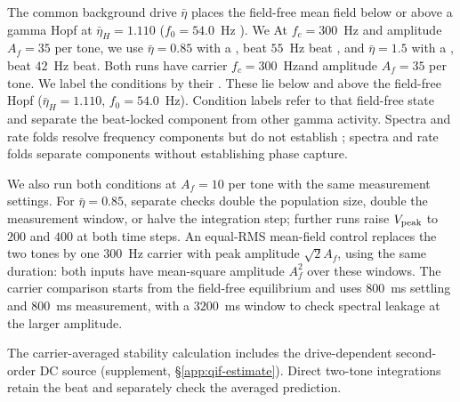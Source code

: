 \documentclass[11pt,a4paper]{article}
\providecommand{\DIFaddtex}[1]{{\protect\color{blue} \sf #1}} %
\providecommand{\DIFdeltex}[1]{{\protect\color{red} \scriptsize #1}} %
\providecommand{\DIFaddbegin}{} %
\providecommand{\DIFaddend}{} %
\providecommand{\DIFdelbegin}{} %
\providecommand{\DIFdelend}{} %
\providecommand{\DIFadd}[1]{\texorpdfstring{\DIFaddtex{#1}}{#1}} %
\providecommand{\DIFdel}[1]{\texorpdfstring{\DIFdeltex{#1}}{}} %
\begin{document}
\DIFdelbegin \DIFdel{The common background drive $\bar\eta$ places the field-free mean field below or
above a gamma Hopf at $\bar\eta_H=1.110$ ($f_0=54.0$~Hz ). We }\DIFdelend \DIFaddbegin \DIFadd{At $f_c=300$~Hz and amplitude $A_f=35$ per tone, we }\DIFaddend use
$\bar\eta=0.85$\DIFdelbegin \DIFdel{with a }\DIFdelend \DIFaddbegin \DIFadd{, beat }\DIFaddend $55$~Hz\DIFdelbegin \DIFdel{beat }\DIFdelend \DIFaddbegin \DIFadd{, }\DIFaddend and $\bar\eta=1.5$\DIFdelbegin \DIFdel{with a }\DIFdelend \DIFaddbegin \DIFadd{, beat }\DIFaddend $42$~Hz\DIFdelbegin \DIFdel{beat.
Both runs have carrier $f_c=300$~Hzand amplitude $A_f=35$ per tone. We label the conditions by their }\DIFdelend \DIFaddbegin \DIFadd{.
These lie below and above the }\DIFaddend field-free \DIFaddbegin \DIFadd{Hopf
($\bar\eta_H=1.110$, $f_0=54.0$~Hz). Condition labels refer to that
field-free }\DIFaddend state\DIFdelbegin \DIFdel{and separate the beat-locked
component from other gamma activity. Spectra and rate folds resolve frequency components but do not establish
}\DIFdelend \DIFaddbegin \DIFadd{; spectra and rate folds separate components without
establishing }\DIFaddend phase capture.

We also run both conditions at $A_f=10$ per tone with the same measurement
settings. For $\bar\eta=0.85$, separate checks double the population size,
double the measurement window, or halve the integration step; further runs raise
$V_{\rm peak}$ to $200$ and $400$ at both time steps. An equal-RMS
mean-field control replaces the two tones by one $300$~Hz carrier with peak
amplitude $\sqrt{2}A_f$, using the same duration: both inputs have mean-square
amplitude $A_f^2$ over these windows. The carrier comparison starts from the
field-free equilibrium and uses $800$~ms settling and $800$~ms measurement,
with a $3200$~ms window to check spectral leakage at the larger amplitude.

The carrier-averaged stability calculation includes the drive-dependent
second-order DC source (supplement, \S\ref{app:qif-estimate}). Direct two-tone
integrations retain the beat and separately check the averaged prediction.
\end{document}

